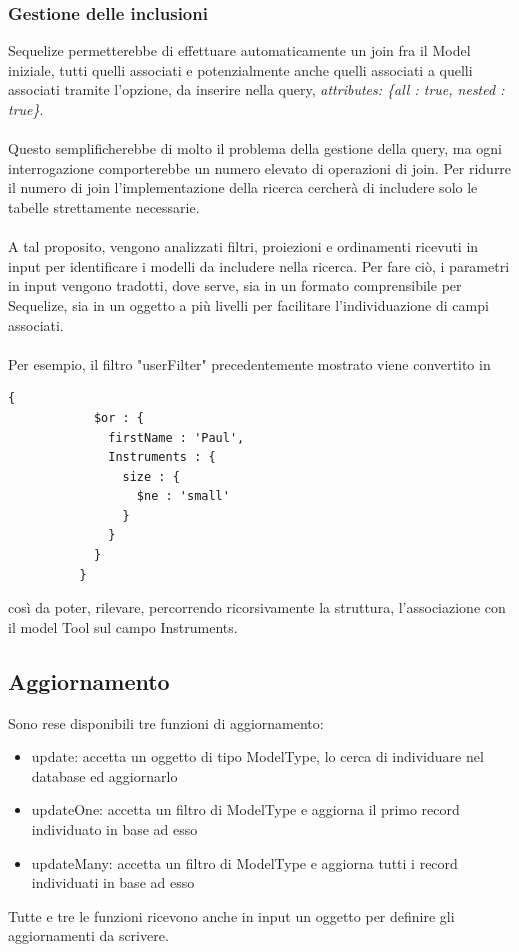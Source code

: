 \documentclass[a4paper, 12pt]{report}
\begin{document}
      \subsubsection*{Gestione delle inclusioni}
        Sequelize permetterebbe di effettuare automaticamente un join fra il Model iniziale, tutti quelli associati e potenzialmente anche quelli associati a quelli associati tramite l'opzione, da inserire nella query,
        \emph{attributes: \{all : true, nested : true\}}.
        \paragraph*{}
        Questo semplificherebbe di molto il problema della gestione della query, ma ogni interrogazione comporterebbe un numero elevato di operazioni di join.
        Per ridurre il numero di join l'implementazione della ricerca cercherà di includere solo le tabelle strettamente necessarie.
        \paragraph*{}
        A tal proposito, vengono analizzati filtri, proiezioni e ordinamenti ricevuti in input per identificare i modelli da includere nella ricerca.
        Per fare ciò, i parametri in input vengono tradotti, dove serve, sia in un formato comprensibile per Sequelize, sia in un oggetto a più livelli per facilitare l'individuazione di campi associati.
        \paragraph*{}
        Per esempio, il filtro "userFilter" precedentemente mostrato viene convertito in
        \begin{Verbatim}[samepage=true]
          {
            $or : {
              firstName : 'Paul',
              Instruments : {
                size : {
                  $ne : 'small'
                }
              }
            }
          }
        \end{Verbatim}
        così da poter, rilevare, percorrendo ricorsivamente la struttura, l'associazione con il model Tool sul campo Instruments.
    \subsection{Aggiornamento}
      Sono rese disponibili tre funzioni di aggiornamento: 
      \begin{itemize}
        \item update: accetta un oggetto di tipo ModelType, lo cerca di individuare nel database ed aggiornarlo
        \item updateOne: accetta un filtro di ModelType e aggiorna il primo record individuato in base ad esso
        \item updateMany: accetta un filtro di ModelType e aggiorna tutti i record individuati in base ad esso
      \end{itemize} 
      Tutte e tre le funzioni ricevono anche in input un oggetto per definire gli aggiornamenti da scrivere.
\end{document}
